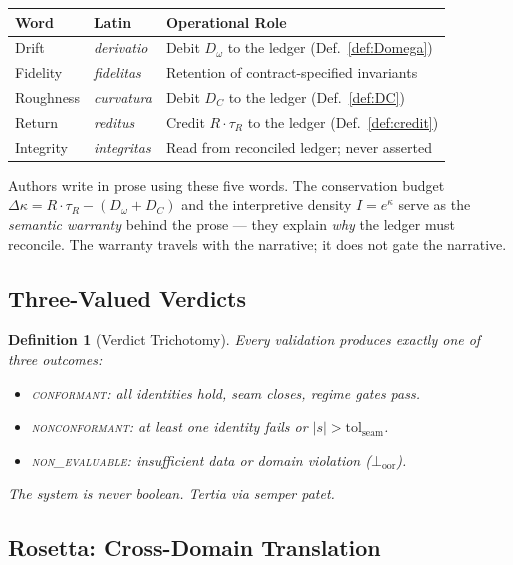 \documentclass[
  aps,
  prd,
  preprint,
  superscriptaddress,
  nofootinbib,
  floatfix,
  longbibliography
]{revtex4-2}
\newtheorem{definition}[theorem]{Definition}
\newcommand{\tR}{\tau_{\!R}}
\newcommand{\tolseam}{\mathrm{tol}_{\mathrm{seam}}}
\newcommand{\regime}[1]{\textnormal{\textsc{#1}}}
\newcommand{\conform}{\regime{conformant}}
\newcommand{\nonconform}{\regime{nonconformant}}
\newcommand{\Drft}{\omega}
\newcommand{\Curv}{C}
\newcommand{\Logint}{\kappa}
\newcommand{\lat}[1]{\textit{#1}}
\begin{document}
\begin{center}
\begin{tabular}{@{}lll@{}}
\toprule
\textbf{Word} & \textbf{Latin} & \textbf{Operational Role} \\
\midrule
Drift      & \lat{derivatio} &
  Debit $D_\Drft$ to the ledger (Def.~\ref{def:Domega}) \\
Fidelity   & \lat{fidelitas} &
  Retention of contract-specified invariants \\
Roughness  & \lat{curvatura} &
  Debit $D_\Curv$ to the ledger (Def.~\ref{def:DC}) \\
Return     & \lat{reditus} &
  Credit $R \cdot \tR$ to the ledger (Def.~\ref{def:credit}) \\
Integrity  & \lat{integritas} &
  Read from reconciled ledger; never asserted \\
\bottomrule
\end{tabular}
\end{center}

Authors write in prose using these five words.
The conservation budget
$\Delta\Logint = R \cdot \tR - (D_\Drft + D_\Curv)$
and the interpretive density $I = e^\Logint$ serve as
the \emph{semantic warranty} behind the prose — they
explain \emph{why} the ledger must reconcile.
The warranty travels with the narrative; it does not
gate the narrative.

\subsection{Three-Valued Verdicts}

\begin{definition}[Verdict Trichotomy]\label{def:verdict}
Every validation produces exactly one of three outcomes:
\begin{itemize}[nosep,leftmargin=*]
  \item \conform{}: all identities hold, seam closes,
    regime gates pass.
  \item \nonconform{}: at least one identity fails or
    $|s| > \tolseam$.
  \item \regime{non\_evaluable}: insufficient data or
    domain violation ($\bot_{\mathrm{oor}}$).
\end{itemize}
The system is never boolean.
\lat{Tertia via semper patet.}
\end{definition}

\subsection{Rosetta: Cross-Domain Translation}
\end{document}

